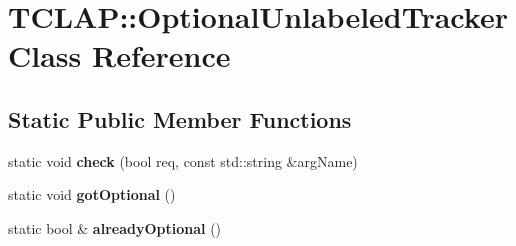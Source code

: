 \hypertarget{class_t_c_l_a_p_1_1_optional_unlabeled_tracker}{\section{T\+C\+L\+A\+P\+:\+:Optional\+Unlabeled\+Tracker Class Reference}
\label{class_t_c_l_a_p_1_1_optional_unlabeled_tracker}
}
\subsection*{Static Public Member Functions}
\begin{DoxyCompactItemize}
\item 
\hypertarget{class_t_c_l_a_p_1_1_optional_unlabeled_tracker_a59bfa7d01b45d4796500470c9218e390}{static void {\bfseries check} (bool req, const std\+::string \&arg\+Name)}\label{class_t_c_l_a_p_1_1_optional_unlabeled_tracker_a59bfa7d01b45d4796500470c9218e390}

\item 
\hypertarget{class_t_c_l_a_p_1_1_optional_unlabeled_tracker_aca1fc2a02fbde351cce7ea05f0e6ef89}{static void {\bfseries got\+Optional} ()}\label{class_t_c_l_a_p_1_1_optional_unlabeled_tracker_aca1fc2a02fbde351cce7ea05f0e6ef89}

\item 
\hypertarget{class_t_c_l_a_p_1_1_optional_unlabeled_tracker_a50fc04586196c0861491968fcdadf48b}{static bool \& {\bfseries already\+Optional} ()}\label{class_t_c_l_a_p_1_1_optional_unlabeled_tracker_a50fc04586196c0861491968fcdadf48b}

\end{DoxyCompactItemize}
